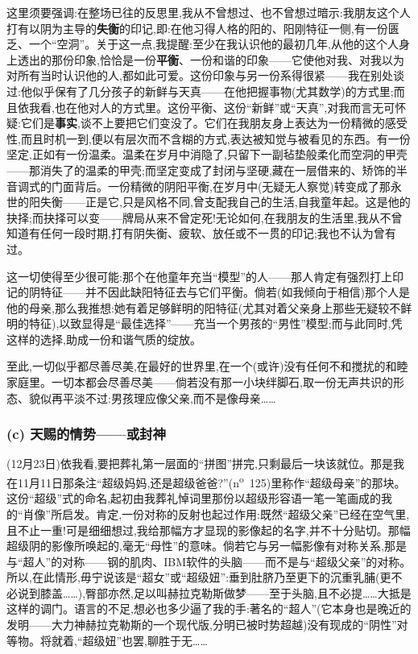 这里须要强调:在整场已往的反思里,我从不曾想过、也不曾想过暗示:我朋友这个人打有以阴为主导的\textbf{失衡}的印记,即:在他习得人格的阳的、阳刚特征一侧,有一份匮乏、一个“空洞”。关于这一点,我提醒:至少在我认识他的最初几年,从他的这个人身上透出的那份印象,恰恰是一份\textbf{平衡}、一份和谐的印象——它使他对我、对我以为对所有当时认识他的人,都如此可爱。这份印象与另一份系得很紧——我在别处谈过:他似乎保有了几分孩子的新鲜与天真——在他把握事物(尤其数学)的方式里;而且依我看,也在他对人的方式里。这份平衡、这份“新鲜”或“天真”,对我而言无可怀疑:它们是\textbf{事实},谈不上要把它们变没了。它们在我朋友身上表达为一份精微的感受性,而且时机一到,便以有层次而不含糊的方式,表达被知觉与被看见的东西。有一份坚定,正如有一份温柔。温柔在岁月中消隐了,只留下一副毡垫般柔化而空洞的甲壳——那消失了的温柔的甲壳;而坚定变成了封闭与坚硬,藏在一层借来的、矫饰的半音调式的门面背后。一份精微的阴阳平衡,在岁月中(无疑无人察觉)转变成了那永世的阳失衡——正是它,只是风格不同,曾支配我自己的生活,自我童年起。这是他的抉择;而抉择可以变——牌局从来不曾定死!无论如何,在我朋友的生活里,我从不曾知道有任何一段时期,打有阴失衡、疲软、放任或不一贯的印记;我也不认为曾有过。

这一切使得至少很可能:那个在他童年充当“模型”的人——那人肯定有强烈打上印记的阴特征——并不因此缺阳特征去与它们平衡。倘若(如我倾向于相信)那个人是他的母亲,那么我推想:她有着足够鲜明的阳特征(尤其对着父亲身上那些无疑较不鲜明的特征),以致显得是“最佳选择”——充当一个男孩的“男性”模型;而与此\dmark{}同时,凭这样的选择,助成一份和谐气质的绽放。

至此,一切似乎都尽善尽美,在最好的世界里,在一个(或许)没有任何不和搅扰的和睦家庭里。一切本都会尽善尽美——倘若没有那一小块绊脚石,取一份无声共识的形态、貌似再平淡不过:男孩理应像父亲,而不是像母亲……

\subsubsection*{(c) 天赐的情势——或封神}
\label{ch18:local:h65}

\label{ch18:local:n59}

(12月23日)依我看,要把葬礼第一层面的“拼图”拼完,只剩最后一块该就位。那是我在11月11日那条注“超级妈妈,还是超级爸爸?”(n\textsuperscript{o}~125)里称作“超级母亲”的那块。这份“超级”式的命名,起初由我葬礼悼词里那份以超级形容语一笔一笔画成的我的“肖像”所启发。肯定,一份对称的反射也起过作用:既然“超级父亲”已经在空气里,且不止一重!可是细细想过,我给那幅方才显现的影像起的名字,并不十分贴切。那幅超级阴的影像所唤起的,毫无“母性”的意味。倘若它与另一幅影像有对称关系,那是与“超人”的对称——钢的肌肉、IBM软件的头脑——而不是与“超级父亲”的对称。所以,在此情形,毋宁说该是“超女”或“超级妞”:垂到肚脐乃至更下的沉重乳脯(更不必说到膝盖……),臀部亦然,足以叫赫拉克勒斯做梦——至于头脑,且不必提……大抵是这样的调门。语言的不足,想必也多少逼了我的手:著名的“超人”(它本身也是晚近的发明——大力神赫拉克勒斯的一个现代版,分明已被时势超越)没有现成的“阴性”对等物。将就着,“超级妞”也罢,聊胜于无……

